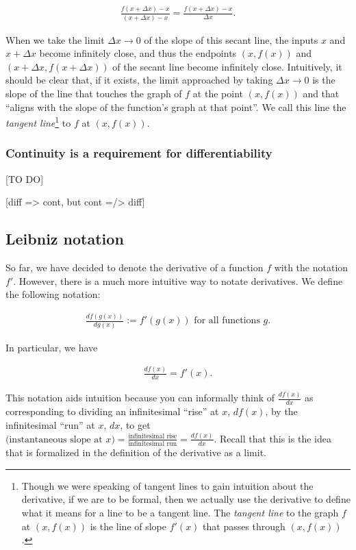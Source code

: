 \begin{align*}
    \frac{f(x + \Delta x) - x}{(x + \Delta x) - x} = \frac{f(x + \Delta x) - x}{\Delta x}.
\end{align*}

When we take the limit $\Delta x \rightarrow 0$ of the slope of this secant line, the inputs $x$ and $x + \Delta x$ become infinitely close, and thus the endpoints $(x, f(x))$ and $(x + \Delta x, f(x + \Delta x))$ of the secant line become infinitely close. Intuitively, it should be clear that, if it exists, the limit approached by taking $\Delta x \rightarrow 0$ is the slope of the line that touches the graph of $f$ at the point $(x, f(x))$ and that ``aligns with the slope of the function's graph at that point''. We call this line the \textit{tangent line}\footnote{Though we were speaking of tangent lines to gain intuition about the derivative, if we are to be formal, then we actually use the derivative to define what it means for a line to be a tangent line. The \textit{tangent line} to the graph $f$ at $(x, f(x))$ is the line of slope $f'(x)$ that passes through $(x, f(x))$.} to $f$ at $(x, f(x))$.

\subsubsection*{Continuity is a requirement for differentiability}

[TO DO]

[diff => cont, but cont =/> diff]

\subsection*{Leibniz notation}
     
So far, we have decided to denote the derivative of a function $f$ with the notation $f'$. However, there is a much more intuitive way to notate derivatives. We define the following notation:

\begin{align*}
    \frac{df(g(x))}{dg(x)} := f'(g(x)) \text{ for all functions $g$}. 
\end{align*}

In particular, we have

\begin{align*}
    \frac{df(x)}{dx} = f'(x).
\end{align*}

This notation aids intuition because you can informally think of $\frac{df(x)}{dx}$ as corresponding to dividing an infinitesimal ``rise'' at $x$, $df(x)$, by the infinitesimal ``run'' at $x$, $dx$, to get $(\text{instantaneous slope at $x$)} = \frac{\text{infinitesimal rise}}{\text{infinitesimal run}} = \frac{df(x)}{dx}$. Recall that this is the idea that is formalized in the definition of the derivative as a limit.

